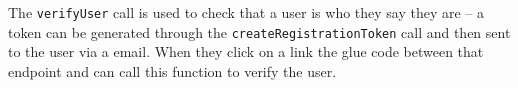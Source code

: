 The \verb+verifyUser+ call is used to check that a user is who they say they are -- a token can be generated through
the \verb+createRegistrationToken+ call and then sent to the user via a email. When they click on a link the glue code
between that endpoint and \Rapture can call this function to verify the user.
